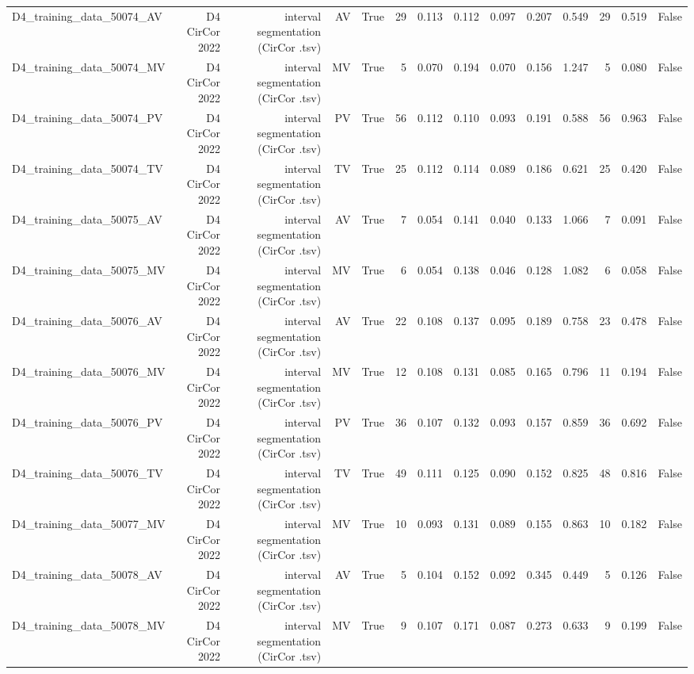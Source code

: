 \begin{table}[htbp]
\begin{tabular}{lrrrrrrrrrrrrr}
    D4\_training\_data\_50074\_AV & D4 CirCor 2022 & interval segmentation (CirCor .tsv) & AV & True & 29 & 0.113 & 0.112 & 0.097 & 0.207 & 0.549 & 29 & 0.519 & False \\
    D4\_training\_data\_50074\_MV & D4 CirCor 2022 & interval segmentation (CirCor .tsv) & MV & True & 5 & 0.070 & 0.194 & 0.070 & 0.156 & 1.247 & 5 & 0.080 & False \\
    D4\_training\_data\_50074\_PV & D4 CirCor 2022 & interval segmentation (CirCor .tsv) & PV & True & 56 & 0.112 & 0.110 & 0.093 & 0.191 & 0.588 & 56 & 0.963 & False \\
    D4\_training\_data\_50074\_TV & D4 CirCor 2022 & interval segmentation (CirCor .tsv) & TV & True & 25 & 0.112 & 0.114 & 0.089 & 0.186 & 0.621 & 25 & 0.420 & False \\
    D4\_training\_data\_50075\_AV & D4 CirCor 2022 & interval segmentation (CirCor .tsv) & AV & True & 7 & 0.054 & 0.141 & 0.040 & 0.133 & 1.066 & 7 & 0.091 & False \\
    D4\_training\_data\_50075\_MV & D4 CirCor 2022 & interval segmentation (CirCor .tsv) & MV & True & 6 & 0.054 & 0.138 & 0.046 & 0.128 & 1.082 & 6 & 0.058 & False \\
    D4\_training\_data\_50076\_AV & D4 CirCor 2022 & interval segmentation (CirCor .tsv) & AV & True & 22 & 0.108 & 0.137 & 0.095 & 0.189 & 0.758 & 23 & 0.478 & False \\
    D4\_training\_data\_50076\_MV & D4 CirCor 2022 & interval segmentation (CirCor .tsv) & MV & True & 12 & 0.108 & 0.131 & 0.085 & 0.165 & 0.796 & 11 & 0.194 & False \\
    D4\_training\_data\_50076\_PV & D4 CirCor 2022 & interval segmentation (CirCor .tsv) & PV & True & 36 & 0.107 & 0.132 & 0.093 & 0.157 & 0.859 & 36 & 0.692 & False \\
    D4\_training\_data\_50076\_TV & D4 CirCor 2022 & interval segmentation (CirCor .tsv) & TV & True & 49 & 0.111 & 0.125 & 0.090 & 0.152 & 0.825 & 48 & 0.816 & False \\
    D4\_training\_data\_50077\_MV & D4 CirCor 2022 & interval segmentation (CirCor .tsv) & MV & True & 10 & 0.093 & 0.131 & 0.089 & 0.155 & 0.863 & 10 & 0.182 & False \\
    D4\_training\_data\_50078\_AV & D4 CirCor 2022 & interval segmentation (CirCor .tsv) & AV & True & 5 & 0.104 & 0.152 & 0.092 & 0.345 & 0.449 & 5 & 0.126 & False \\
    D4\_training\_data\_50078\_MV & D4 CirCor 2022 & interval segmentation (CirCor .tsv) & MV & True & 9 & 0.107 & 0.171 & 0.087 & 0.273 & 0.633 & 9 & 0.199 & False \\

\end{tabular}
\end{table}
